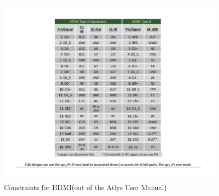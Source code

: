 \begin{figure}[h]
\includegraphics[scale=1.1]{images/hdmi_constraints.png} 

\caption{Constraints for HDMI(out of the Atlys User Manual)}
\label{hdmi_constraints}
\end{figure}

